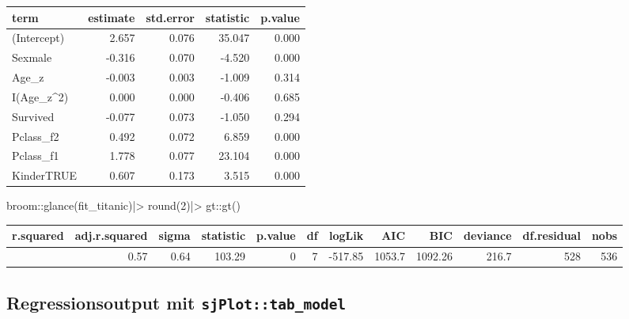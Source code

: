 \documentclass[
  10pt,
  letterpaper,
  a4paper, twoside]{scrreprt}
\newenvironment{Shaded}{\begin{snugshade}}{\end{snugshade}}
\newcommand{\DecValTok}[1]{\textcolor[rgb]{0.68,0.00,0.00}{#1}}
\newcommand{\FunctionTok}[1]{\textcolor[rgb]{0.28,0.35,0.67}{#1}}
\newcommand{\NormalTok}[1]{\textcolor[rgb]{0.00,0.23,0.31}{#1}}
\newcommand{\SpecialCharTok}[1]{\textcolor[rgb]{0.37,0.37,0.37}{#1}}
\begin{document}
\begin{longtable*}{lrrrr}
\toprule
term & estimate & std.error & statistic & p.value \\ 
\midrule\addlinespace[2.5pt]
(Intercept) & 2.657 & 0.076 & 35.047 & 0.000 \\ 
Sexmale & -0.316 & 0.070 & -4.520 & 0.000 \\ 
Age\_z & -0.003 & 0.003 & -1.009 & 0.314 \\ 
I(Age\_z\textasciicircum{}2) & 0.000 & 0.000 & -0.406 & 0.685 \\ 
Survived & -0.077 & 0.073 & -1.050 & 0.294 \\ 
Pclass\_f2 & 0.492 & 0.072 & 6.859 & 0.000 \\ 
Pclass\_f1 & 1.778 & 0.077 & 23.104 & 0.000 \\ 
KinderTRUE & 0.607 & 0.173 & 3.515 & 0.000 \\ 
\bottomrule
\end{longtable*}

\begin{Shaded}
\begin{Highlighting}[]

\NormalTok{broom}\SpecialCharTok{::}\FunctionTok{glance}\NormalTok{(fit\_titanic)}\SpecialCharTok{|\textgreater{}} 
  \FunctionTok{round}\NormalTok{(}\DecValTok{2}\NormalTok{)}\SpecialCharTok{|\textgreater{}}
\NormalTok{  gt}\SpecialCharTok{::}\FunctionTok{gt}\NormalTok{()}
\end{Highlighting}
\end{Shaded}

\begin{longtable*}{rrrrrrrrrrrr}
\toprule
r.squared & adj.r.squared & sigma & statistic & p.value & df & logLik & AIC & BIC & deviance & df.residual & nobs \\ 
\midrule{} & 0.57 & 0.64 & 103.29 & 0 & 7 & -517.85 & 1053.7 & 1092.26 & 216.7 & 528 & 536 \\ 
\bottomrule
\end{longtable*}

\subsection*{\texorpdfstring{Regressionsoutput mit
\texttt{sjPlot::tab\_model}}{Regressionsoutput mit sjPlot::tab\_model}}\label{regressionsoutput-mit-sjplottab_model}
\end{document}
